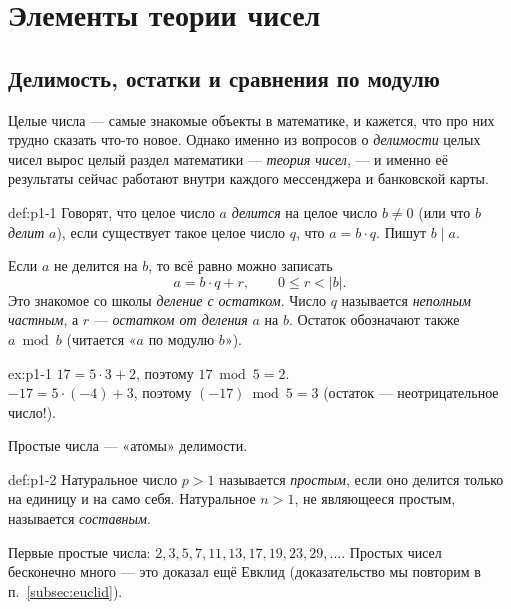 
\section{Элементы теории чисел}
\label{sec:numtheory}

\subsection{Делимость, остатки и сравнения по модулю}

Целые числа --- самые знакомые объекты в математике, и кажется, что про них трудно сказать что-то новое. Однако именно из вопросов о \emph{делимости} целых чисел вырос целый раздел математики --- \emph{теория чисел}, --- и именно её результаты сейчас работают внутри каждого мессенджера и банковской карты.

\begin{definition}{}{def:p1-1}
Говорят, что целое число $a$ \emph{делится} на целое число $b \neq 0$ (или что $b$ \emph{делит} $a$), если существует такое целое число $q$, что $a = b\cdot q$. Пишут $b \mid a$.
\end{definition}

Если $a$ не делится на $b$, то всё равно можно записать
\[
a = b\cdot q + r, \qquad 0 \le r < |b|.
\]
Это знакомое со школы \emph{деление с остатком}. Число $q$ называется \emph{неполным частным}, а $r$ --- \emph{остатком от деления} $a$ на $b$. Остаток обозначают также $a \bmod b$ (читается «$a$ по модулю $b$»).

\begin{example}{}{ex:p1-1}
$17 = 5\cdot 3 + 2$, поэтому $17 \bmod 5 = 2$.\\
$-17 = 5\cdot(-4) + 3$, поэтому $(-17)\bmod 5 = 3$ (остаток --- неотрицательное число!).
\end{example}

Простые числа --- «атомы» делимости.

\begin{definition}{}{def:p1-2}
Натуральное число $p > 1$ называется \emph{простым}, если оно делится только на единицу и на само себя. Натуральное $n > 1$, не являющееся простым, называется \emph{составным}.
\end{definition}

Первые простые числа: $2, 3, 5, 7, 11, 13, 17, 19, 23, 29, \ldots$. Простых чисел бесконечно много --- это доказал ещё Евклид (доказательство мы повторим в п.~\ref{subsec:euclid}).

